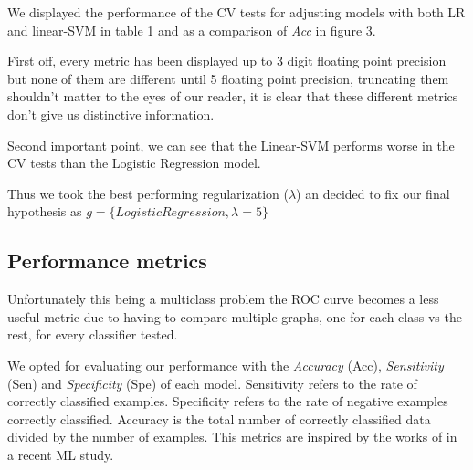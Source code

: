 \documentclass{article}
\begin{document}
\begin{figure}[H]
\centering
\end{figure}

We displayed the performance of the CV tests for adjusting models with both LR and linear-SVM in table 1 and as a comparison of \textit{Acc} in figure 3.

First off, every metric has been displayed up to 3 digit floating point precision but none of them are different until 5 floating point precision, truncating them shouldn't matter to the eyes of our reader, it is clear that these different metrics don't give us distinctive information. 

Second important point, we can see that the Linear-SVM performs worse in the CV tests than the Logistic Regression model.

Thus we took the best performing regularization ($\lambda$) an decided to fix our final hypothesis as $g=\{LogisticRegression, \lambda=5\}$

\subsection{Performance metrics}
Unfortunately this being a multiclass problem the ROC curve becomes a less useful metric due to having to compare multiple graphs, one for each class vs the rest, for every classifier tested.

We opted for evaluating our performance with the \textit{Accuracy} (Acc), \textit{Sensitivity} (Sen) and \textit{Specificity} (Spe) of each model. Sensitivity refers to the rate of correctly classified examples. Specificity refers to the rate of negative examples correctly classified. Accuracy is the total number of correctly classified data divided by the number of examples. This metrics are inspired by the works of \cite{mesejo:hal-01291797} in a recent ML study.
\end{document}
